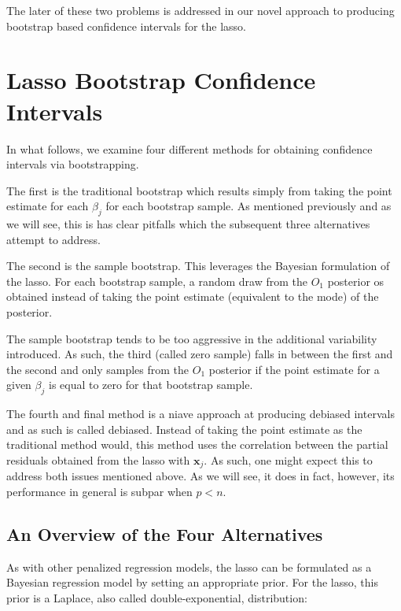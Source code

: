 The later of these two problems is addressed in our novel approach to producing bootstrap based confidence intervals for the lasso.

\section{Lasso Bootstrap Confidence Intervals}

In what follows, we examine four different methods for obtaining confidence intervals via bootstrapping.

The first is the traditional bootstrap which results simply from taking the point estimate for each $\beta_j$ for each bootstrap sample. As mentioned previously and as we will see, this is has clear pitfalls which the subsequent three alternatives attempt to address.

The second is the sample bootstrap. This leverages the Bayesian formulation of the lasso. For each bootstrap sample, a random draw from the $O_1$ posterior os obtained instead of taking the point estimate (equivalent to the mode) of the posterior. 

The sample bootstrap tends to be too aggressive in the additional variability introduced. As such, the third (called zero sample) falls in between the first and the second and only samples from the $O_1$ posterior if the point estimate for a given $\beta_j$ is equal to zero for that bootstrap sample.

The fourth and final method is a niave approach at producing debiased intervals and as such is called debiased. Instead of taking the point estimate as the traditional method would, this method uses the correlation between the partial residuals obtained from the lasso with $\boldsymbol{x}_j$. As such, one might expect this to address both issues mentioned above. As we will see, it does in fact, however, its performance in general is subpar when $p < n$.

\subsection{An Overview of the Four Alternatives}

As with other penalized regression models, the lasso can be formulated as a Bayesian regression model by setting an appropriate prior. For the lasso, this prior is a Laplace, also called double-exponential, distribution:


